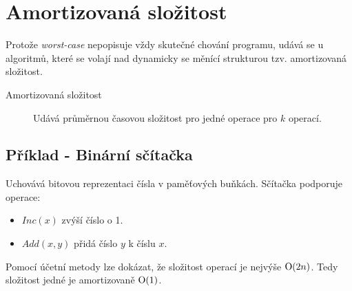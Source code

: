 \section{Amortizovaná složitost}

  Protože \emph{worst-case} nepopisuje vždy skutečné chování programu, udává se u algoritmů, které se volají
  nad dynamicky se měnící strukturou tzv. amortizovaná složitost.

  \begin{description}
    \item[Amortizovaná složitost] Udává průměrnou časovou složitost pro jedné operace pro $k$ operací.
  \end{description}

  \subsection{Příklad - Binární sčítačka}
    Uchovává bitovou reprezentaci čísla v paměťových buňkách. Sčítačka podporuje operace:

    \begin{itemize}
      \item $Inc(x)$ zvýší číslo o 1.
      \item $Add(x,y)$ přidá číslo $y$ k číslu $x$.
    \end{itemize}

    Pomocí účetní metody lze dokázat, že složitost operací je nejvýše $\textrm O(2n)$.
    Tedy složitost jedné je amortizovaně $\textrm O(1)$.
